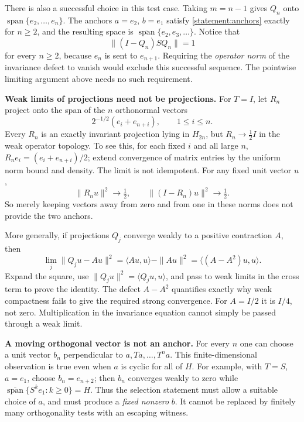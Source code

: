 \documentclass[11pt,a4paper]{article}
\numberwithin{equation}{section}
\begin{document}
There is also a successful choice in this test case. Taking $m=n-1$ gives
$Q_n$ onto $\operatorname{span}\{e_2,\ldots,e_n\}$. The anchors $a=e_2$,
$b=e_1$ satisfy \eqref{statement:anchors} exactly for $n\geq2$, and the resulting
space is $\overline{\operatorname{span}}\{e_2,e_3,\ldots\}$. Notice that
\[
 \|(I-Q_n)SQ_n\|=1
\]
for every $n\geq2$, because $e_n$ is sent to $e_{n+1}$. Requiring the
\emph{operator norm} of the invariance defect to vanish would exclude this
successful sequence. The pointwise limiting argument above needs no such
requirement.

\textbf{Weak limits of projections need not be projections.}
For $T=I$, let $R_n$ project onto the span of the $n$ orthonormal vectors
\[
 2^{-1/2}(e_i+e_{n+i}),\qquad1\leq i\leq n.
\]
Every $R_n$ is an exactly invariant projection lying in $H_{2n}$, but
$R_n\to\tfrac12 I$ in the weak operator topology. To see this, for each fixed
$i$ and all large $n$,
$R_ne_i=(e_i+e_{n+i})/2$; extend convergence of matrix entries by the uniform
norm bound and density. The limit is not idempotent. For any fixed unit
vector $u$,
\[
 \|R_nu\|^2\to\tfrac12,
 \qquad\|(I-R_n)u\|^2\to\tfrac12.
\]
So merely keeping vectors away from zero and from one in these norms does
not provide the two anchors.

More generally, if projections $Q_j$ converge weakly to a positive
contraction $A$, then
\begin{equation}\label{statement:variance}
 \lim_j\|Q_ju-Au\|^2
 =\langle Au,u\rangle-\|Au\|^2
 =\langle(A-A^2)u,u\rangle.
\end{equation}
Expand the square, use $\|Q_ju\|^2=\langle Q_ju,u\rangle$, and pass to
weak limits in the cross term to prove the identity. The defect $A-A^2$
quantifies exactly why weak compactness fails to give the required strong
convergence. For $A=I/2$ it is $I/4$, not zero. Multiplication in the
invariance equation cannot simply be passed through a weak limit.

\textbf{A moving orthogonal vector is not an anchor.}
For every $n$ one can choose a unit vector $b_n$ perpendicular to
$a,Ta,\ldots,T^na$. This finite-dimensional observation is true even when
$a$ is cyclic for all of $H$. For example, with $T=S$, $a=e_1$, choose
$b_n=e_{n+2}$; then $b_n$ converges weakly to zero while
$\overline{\operatorname{span}}\{S^ke_1:k\geq0\}=H$.
Thus the selection statement must allow a suitable choice of $a$, and must
produce a \emph{fixed nonzero} $b$. It cannot be replaced by finitely many
orthogonality tests with an escaping witness.
\end{document}

